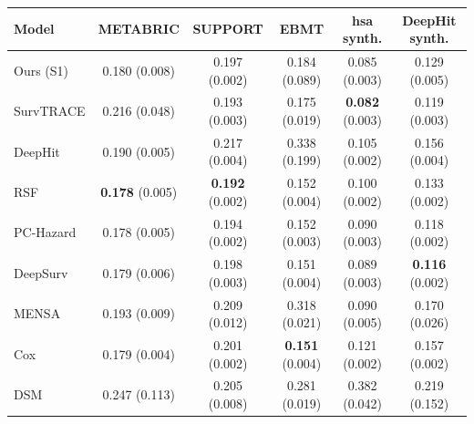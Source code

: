 \begin{tabular}{lccccc}
\toprule
Model & METABRIC & SUPPORT & EBMT & hsa synth. & DeepHit synth. \\
\midrule
Ours (S1) & 0.180 (0.008) & 0.197 (0.002) & 0.184 (0.089) & 0.085 (0.003) & 0.129 (0.005) \\
SurvTRACE & 0.216 (0.048) & 0.193 (0.003) & 0.175 (0.019) & \textbf{0.082} (0.003) & 0.119 (0.003) \\
DeepHit & 0.190 (0.005) & 0.217 (0.004) & 0.338 (0.199) & 0.105 (0.002) & 0.156 (0.004) \\
RSF & \textbf{0.178} (0.005) & \textbf{0.192} (0.002) & 0.152 (0.004) & 0.100 (0.002) & 0.133 (0.002) \\
PC-Hazard & 0.178 (0.005) & 0.194 (0.002) & 0.152 (0.003) & 0.090 (0.003) & 0.118 (0.002) \\
DeepSurv & 0.179 (0.006) & 0.198 (0.003) & 0.151 (0.004) & 0.089 (0.003) & \textbf{0.116} (0.002) \\
MENSA & 0.193 (0.009) & 0.209 (0.012) & 0.318 (0.021) & 0.090 (0.005) & 0.170 (0.026) \\
Cox & 0.179 (0.004) & 0.201 (0.002) & \textbf{0.151} (0.004) & 0.121 (0.002) & 0.157 (0.002) \\
DSM & 0.247 (0.113) & 0.205 (0.008) & 0.281 (0.019) & 0.382 (0.042) & 0.219 (0.152) \\
\bottomrule
\end{tabular}
